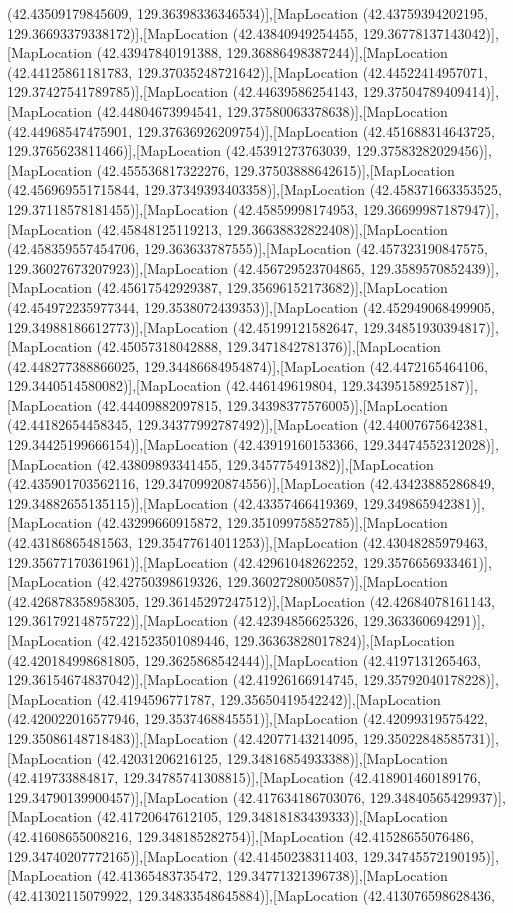 (42.43509179845609, 129.36398336346534)],[MapLocation (42.43759394202195, 129.36693379338172)],[MapLocation (42.43840949254455, 129.36778137143042)],[MapLocation (42.43947840191388, 129.36886498387244)],[MapLocation (42.44125861181783, 129.37035248721642)],[MapLocation (42.44522414957071, 129.37427541789785)],[MapLocation (42.44639586254143, 129.37504789409414)],[MapLocation (42.44804673994541, 129.37580063378638)],[MapLocation (42.44968547475901, 129.37636926209754)],[MapLocation (42.451688314643725, 129.3765623811466)],[MapLocation (42.45391273763039, 129.37583282029456)],[MapLocation (42.455536817322276, 129.37503888642615)],[MapLocation (42.456969551715844, 129.37349393403358)],[MapLocation (42.458371663353525, 129.37118578181455)],[MapLocation (42.45859998174953, 129.36699987187947)],[MapLocation (42.45848125119213, 129.36638832822408)],[MapLocation (42.458359557454706, 129.363633787555)],[MapLocation (42.457323190847575, 129.36027673207923)],[MapLocation (42.456729523704865, 129.3589570852439)],[MapLocation (42.45617542929387, 129.35696152173682)],[MapLocation (42.454972235977344, 129.3538072439353)],[MapLocation (42.452949068499905, 129.34988186612773)],[MapLocation (42.45199121582647, 129.34851930394817)],[MapLocation (42.45057318042888, 129.3471842781376)],[MapLocation (42.448277388866025, 129.34486684954874)],[MapLocation (42.4472165464106, 129.3440514580082)],[MapLocation (42.446149619804, 129.34395158925187)],[MapLocation (42.44409882097815, 129.34398377576005)],[MapLocation (42.44182654458345, 129.34377992787492)],[MapLocation (42.44007675642381, 129.34425199666154)],[MapLocation (42.43919160153366, 129.34474552312028)],[MapLocation (42.43809893341455, 129.345775491382)],[MapLocation (42.435901703562116, 129.34709920874556)],[MapLocation (42.43423885286849, 129.34882655135115)],[MapLocation (42.43357466419369, 129.349865942381)],[MapLocation (42.43299660915872, 129.35109975852785)],[MapLocation (42.43186865481563, 129.35477614011253)],[MapLocation (42.43048285979463, 129.35677170361961)],[MapLocation (42.42961048262252, 129.3576656933461)],[MapLocation (42.42750398619326, 129.36027280050857)],[MapLocation (42.426878358958305, 129.36145297247512)],[MapLocation (42.42684078161143, 129.36179214875722)],[MapLocation (42.42394856625326, 129.363360694291)],[MapLocation (42.421523501089446, 129.36363828017824)],[MapLocation (42.420184998681805, 129.3625868542444)],[MapLocation (42.4197131265463, 129.36154674837042)],[MapLocation (42.41926166914745, 129.35792040178228)],[MapLocation (42.4194596771787, 129.35650419542242)],[MapLocation (42.420022016577946, 129.3537468845551)],[MapLocation (42.42099319575422, 129.35086148718483)],[MapLocation (42.42077143214095, 129.35022848585731)],[MapLocation (42.42031206216125, 129.34816854933388)],[MapLocation (42.419733884817, 129.34785741308815)],[MapLocation (42.418901460189176, 129.34790139900457)],[MapLocation (42.417634186703076, 129.34840565429937)],[MapLocation (42.41720647612105, 129.34818183439333)],[MapLocation (42.41608655008216, 129.348185282754)],[MapLocation (42.41528655076486, 129.34740207772165)],[MapLocation (42.41450238311403, 129.34745572190195)],[MapLocation (42.41365483735472, 129.34771321396738)],[MapLocation (42.41302115079922, 129.34833548645884)],[MapLocation (42.413076598628436, 